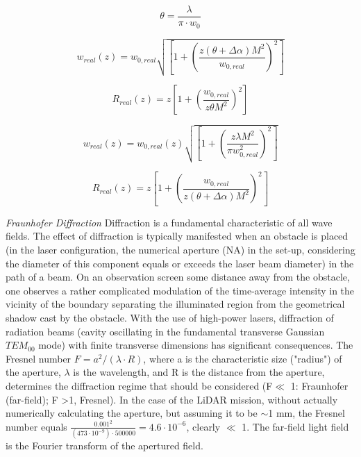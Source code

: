 \begin{equation}
\theta = \frac{\lambda}{\pi\cdot w_{0}}
\end{equation}

\begin{equation}
w_{real}(z)=w_{0,real}\sqrt{\left[1 + \left(\frac{z(\theta+\Delta \alpha) M^{2}}{w_{0,real}}\right)^{2}\right]}
\end{equation}

\begin{equation}
R_{real}(z)=z\left[1 + \left(\frac{w_{0,real}}{z\theta M^{2}}\right)^{2}\right]
\end{equation}

\begin{equation}
w_{real}(z)=w_{0,real}(z)\sqrt{\left[1 + \left(\frac{z\lambda M^{2}}{\pi w_{0,real}^{2}}\right)^{2}\right]}
\end{equation}

\begin{equation}
R_{real}(z)=z\left[1 + \left(\frac{w_{0,real}}{z(\theta+\Delta \alpha) M^{2}}\right)^{2}\right]
\end{equation}

\textit{Fraunhofer Diffraction} 
Diffraction is a fundamental characteristic of all wave fields. The effect of diffraction is typically manifested when an obstacle is placed (in the \acs{laser} configuration, the numerical aperture (NA) in the set-up, considering the diameter of this component equals or exceeds the \acs{laser} beam diameter) in the path of a beam.  On an observation screen some distance away from the obstacle, one observes a rather complicated modulation of the time-average intensity in the vicinity of the boundary separating the illuminated region from the geometrical shadow cast by the obstacle. With the use of high-power lasers, diffraction of radiation beams (cavity oscillating in the fundamental transverse Gaussian $TEM_{00}$ mode) with finite transverse dimensions has significant consequences. The Fresnel number $F = a^{2}/(\lambda \cdot R)$, where a is the characteristic size ("radius") of the aperture,  $\lambda$ is the wavelength, and R is the distance from the aperture, determines the diffraction regime that should be considered (F$\ll$ 1: Fraunhofer (far-field); F \textgreater 1, Fresnel). In the case of the \acs{LiDAR} mission, without actually numerically calculating the aperture, but assuming it to be $\sim$1 mm, the Fresnel number equals $\frac{0.001^{2}}{(473\cdot10^{-9})\cdot500000}=4.6\cdot10^{-6}$, clearly $\ll$ 1. The far-field light field is the Fourier transform of the apertured field.
	
